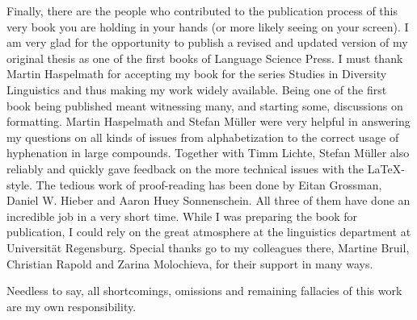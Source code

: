 Finally, there are the people who contributed to the publication process of this very book you are holding in your hands (or more likely seeing on your screen). 
I am very glad for the opportunity to publish a revised and updated version of my original thesis as one of the first books of Language Science Press.
I must thank Martin Haspelmath for accepting my book for the series Studies in Diversity Linguistics and thus making my work widely available.
Being one of the first book being published meant witnessing many, and starting some, discussions on formatting.  
Martin Haspelmath and Stefan M\"uller were very helpful in answering my questions on all kinds of issues from alphabetization to the correct usage of hyphenation in large compounds.
Together with Timm Lichte, Stefan M\"uller also reliably and quickly gave feedback on the more technical issues with the \LaTeX -style.  
The tedious work of proof-reading has been done by Eitan Grossman, Daniel W. Hieber and Aaron Huey Sonnenschein. 
All three of them have done an incredible job in a very short time. 
While I was preparing the book for publication, I could rely on the great atmosphere at the linguistics department at Universität Regensburg. 
Special thanks go to my colleagues there, Martine Bruil, Christian Rapold and Zarina Molochieva, for their support in many ways. 

\enlargethispage{\baselineskip}
Needless to say, all shortcomings, omissions and remaining fallacies of this work are my own responsibility.



 

